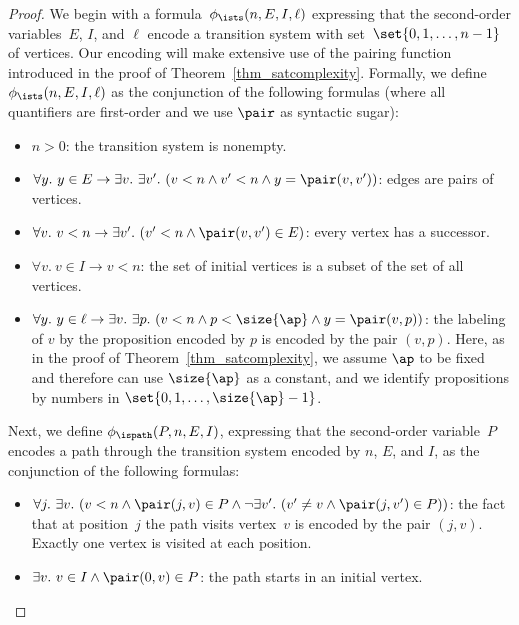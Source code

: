 \begin{proof}
We begin with a formula~$\phi_\ists(n, E, I, \ell)$ expressing that the second-order variables~$E$, $I$, and $\ell$ encode a transition system with set~$\set{0,1, \ldots, n-1}$ of vertices.
Our encoding will make extensive use of the pairing function introduced in the proof of Theorem~\ref{thm_satcomplexity}.
Formally, we define $\phi_\ists(n, E, I, \ell)$ as the conjunction of the following formulas (where all quantifiers are first-order and we use $\pair$ as syntactic sugar):
\begin{itemize}
    \item $n > 0$: the transition system is nonempty.
    
    \item $\forall y.\ y \in E \rightarrow \exists v.\ \exists v'.\ (v < n \wedge v'<n \wedge y = \pair(v,v'))$: edges are pairs of vertices.

    \item $\forall v.\ v < n \rightarrow \exists v'.\ (v' < n \wedge \pair(v,v') \in E)$: every vertex has a successor.

    \item $\forall v.\ v \in I \rightarrow v < n$: the set of initial vertices is a subset of the set of all vertices.

    \item $\forall y.\ y \in \ell \rightarrow \exists v.\ \exists p.\ (v < n \wedge p < \size{\ap} \wedge y = \pair(v,p))$: the labeling of $v$ by the proposition encoded by $p$ is encoded by the pair $(v,p)$. Here, as in the proof of Theorem~\ref{thm_satcomplexity}, we assume $\ap$ to be fixed and therefore can use $\size{\ap}$ as a constant, and we identify propositions by numbers in $\set{0,1,\ldots, \size{\ap}-1}$.
\end{itemize}

Next, we define $\phi_\ispath(P, n, E, I)$, expressing that the second-order variable~$P$ encodes a path through the transition system encoded by $n$, $E$, and $I$, as the conjunction of the following formulas:
\begin{itemize}
    \item $\forall j.\ \exists v.\ (v < n \wedge \pair(j,v)\in P \wedge \neg \exists v'.\ (v' \neq v \wedge \pair(j,v') \in P))$: the fact that at position~$j$ the path visits vertex~$v$ is encoded by the pair $(j,v)$. Exactly one vertex is visited at each position.

    \item $\exists v.\ v\in I \wedge \pair(0,v) \in P$: the path starts in an initial vertex.


\end{itemize}
\end{proof}
